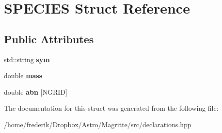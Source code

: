 \hypertarget{structSPECIES}{}\section{S\+P\+E\+C\+I\+ES Struct Reference}
\label{structSPECIES}
\subsection*{Public Attributes}
\begin{DoxyCompactItemize}
\item 
\mbox{\label{structSPECIES_a03fb294f70741b9b9950ddfaecebf31f}} 
std\+::string {\bfseries sym}
\item 
\mbox{\label{structSPECIES_a8333647065f88ce9a184e774af953978}} 
double {\bfseries mass}
\item 
\mbox{\label{structSPECIES_a08693e8b74707799984b252262763be5}} 
double {\bfseries abn} \mbox{[}N\+G\+R\+ID\mbox{]}
\end{DoxyCompactItemize}


The documentation for this struct was generated from the following file\+:\begin{DoxyCompactItemize}
\item 
/home/frederik/\+Dropbox/\+Astro/\+Magritte/src/declarations.\+hpp\end{DoxyCompactItemize}
